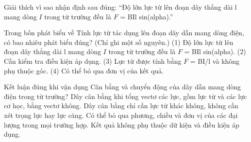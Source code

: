 \begin{bt}
Giải thích vì sao nhận định sau đúng: “Độ lớn lực từ lên đoạn dây thẳng dài l mang dòng $I$ trong từ trường đều là $F$ = BIl sin(alpha).”
\end{bt}

\begin{ex}
Trong bốn phát biểu về Tính lực từ tác dụng lên đoạn dây dẫn mang dòng điện, có bao nhiêu phát biểu đúng? (Chỉ ghi một số nguyên.) (1) Độ lớn lực từ lên đoạn dây thẳng dài l mang dòng $I$ trong từ trường đều là $F$ = BIl sin(alpha). (2) Cần kiểm tra điều kiện áp dụng. (3) Lực từ được tính bằng $F$ = BI/l và không phụ thuộc góc. (4) Có thể bỏ qua đơn vị của kết quả.
\end{ex}

\begin{ex}
Kết luận đúng khi vận dụng Cân bằng và chuyển động của dây dẫn mang dòng điện trong từ trường?
\choice
{\True Dây cân bằng khi tổng vectơ các lực, gồm lực từ và các lực cơ học, bằng vectơ không.}
{Dây cân bằng chỉ cần lực từ khác không, không cần xét trọng lực hay lực căng.}
{Có thể bỏ qua phương, chiều và đơn vị của các đại lượng trong mọi trường hợp.}
{Kết quả không phụ thuộc dữ kiện và điều kiện áp dụng.}
\end{ex}

